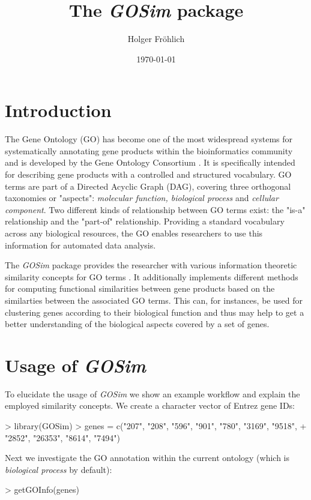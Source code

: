 \documentclass[12pt,a4paper]{article}
\begin{document}
\author{Holger Fröhlich}

\title{The \emph{GOSim} package}
\date{\today}
\maketitle

\section{Introduction}

The Gene Ontology (GO) has become one of the most widespread systems for systematically annotating gene products within the bioinformatics community and is developed by the Gene Ontology Consortium \cite{GOConsortium04}. It is specifically intended for describing gene products with a controlled and structured vocabulary. GO terms are part of a Directed Acyclic Graph (DAG), covering three orthogonal taxonomies or "aspects": \emph{molecular function, biological process} and \emph{cellular component}. Two different kinds of relationship between GO terms exist: the "is-a" relationship and the "part-of" relationship.
Providing a standard vocabulary across any biological resources, the GO enables researchers to use this information for automated data analysis.

The \emph{GOSim} package provides the researcher with various information theoretic similarity concepts for GO terms \cite{Resnik95, Resnik99, Lin98, Jiang98, Lord03, Couto2003FuSSiMeg, Couto2005GraSM}. It additionally implements different methods for computing functional similarities between gene products based on the similarties between the associated GO terms. This can, for instances, be used for clustering genes according to their biological function \cite{FroeGO05, FroeSpeerGOKer06} and thus may help to get a better understanding of the biological aspects covered by a set of genes.

\section{Usage of \emph{GOSim}}

To elucidate the usage of \emph{GOSim} we show an example workflow and explain the employed similarity concepts. We create  a character vector of Entrez gene IDs:
\begin{Schunk}
\begin{Sinput}
> library(GOSim)
> genes = c("207", "208", "596", "901", "780", "3169", "9518", 
+     "2852", "26353", "8614", "7494")
\end{Sinput}
\end{Schunk}
Next we investigate the GO annotation within the current ontology (which is \emph{biological process} by default):
\begin{Schunk}
\begin{Sinput}
> getGOInfo(genes)
\end{Sinput}
\end{Schunk}
\end{document}
